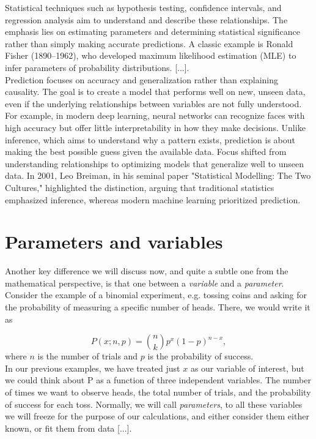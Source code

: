\documentclass{book}
\begin{document}
Statistical techniques such as hypothesis testing, confidence intervals, and regression analysis aim to understand and describe these relationships. The emphasis lies on estimating parameters and determining statistical significance rather than simply making accurate predictions. A classic example is Ronald Fisher (1890–1962), who developed maximum likelihood estimation (MLE) to infer parameters of probability distributions. [...].\\

Prediction focuses on accuracy and generalization rather than explaining causality. The goal is to create a model that performs well on new, unseen data, even if the underlying relationships between variables are not fully understood. For example, in modern deep learning, neural networks can recognize faces with high accuracy but offer little interpretability in how they make decisions. Unlike inference, which aims to understand why a pattern exists, prediction is about making the best possible guess given the available data. Focus shifted from understanding relationships to optimizing models that generalize well to unseen data. In 2001, Leo Breiman, in his seminal paper "Statistical Modelling: The Two Cultures," highlighted the distinction, arguing that traditional statistics emphasized inference, whereas modern machine learning prioritized prediction.\\

\section{Parameters and variables}
Another key difference we will discuss now, and quite a subtle one from the mathematical perspective, is that one between a \textit{variable} and a \textit{parameter}. Consider the example of a binomial experiment, e.g. tossing coins and asking for the probability of measuring a specific number of heads. There, we would write it as 

\begin{equation}
    P(x; n, p) = \binom{n}{k} p^x (1-p)^{n-x},
\end{equation}
where $n$ is the number of trials and $p$ is the probability of success.\\

In our previous examples, we have treated just $x$ as our variable of interest, but we could think about P as a function of three independent variables. The number of times we want to observe heads, the total number of trials, and the probability of success for each toss. Normally, we will call \textit{parameters}, to all these variables we will freeze for the purpose of our calculations, and either consider them either known, or fit them from data [...].
 
\end{document}
